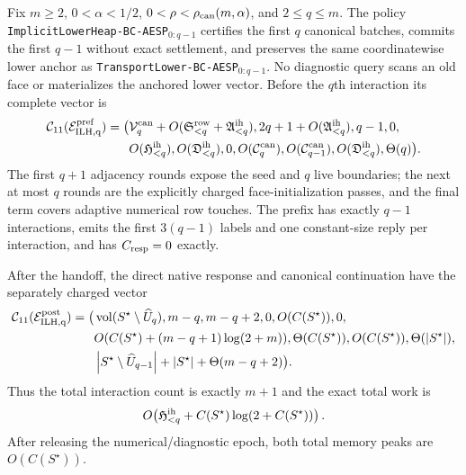 \begin{theorem}
\label{thm:branch-caterpillar-implicit-lower-handoff}
Fix $m\geq2$, $0<\alpha<1/2$,
$0<\rho<\rho_{\rm can}(m,\alpha)$, and $2\leq q\leq m$.
The policy
\texttt{ImplicitLowerHeap-BC-AESP}$_{0:q-1}$ certifies the first $q$
canonical batches, commits the first $q-1$ without exact settlement, and
preserves the same coordinatewise lower anchor as
\texttt{TransportLower-BC-AESP}$_{0:q-1}$.  No diagnostic query scans an old
face or materializes the anchored lower vector.  Before the $q$th interaction
its complete vector is
\begin{equation}
 \begin{aligned}
 \mathcal C_{11}(\mathcal E_{\rm ILH,q}^{\rm pref})=\bigl(&
 \mathcal V_q^{\rm can}
   +O(\mathfrak S_{<q}^{\rm row}+\mathfrak A_{<q}^{\rm ih}),
 2q+1+O(\mathfrak A_{<q}^{\rm ih}),q-1,0,\\
 &O(\mathfrak H_{<q}^{\rm ih}),
 O(\mathfrak D_{<q}^{\rm ih}),0,
 O(\mathcal C_q^{\rm can}),
 O(\mathcal C_{q-1}^{\rm can}),
 O(\mathfrak D_{<q}^{\rm ih}),\Theta(q)\bigr).
 \end{aligned}
 \label{eq:branch-caterpillar-implicit-lower-prefix-eleven-vector}
\end{equation}
The first $q+1$ adjacency rounds expose the seed and $q$ live boundaries;
the next at most $q$ rounds are the explicitly charged face-initialization
passes, and the final term covers adaptive numerical row touches.  The
prefix has exactly $q-1$ interactions, emits the first $3(q-1)$ labels and
one constant-size reply per interaction, and has $C_{\rm resp}=0$ exactly.

After the handoff, the direct native response and canonical continuation have
the separately charged vector
\begin{equation}
 \begin{aligned}
 \mathcal C_{11}(\mathcal E_{\rm ILH,q}^{\rm post})=\bigl(&
 \operatorname{vol}(S^\star\setminus\widehat U_q),m-q,m-q+2,0,
 O(C(S^\star)),0,\\
 &O(C(S^\star)+(m-q+1)\log(2+m)),
 \Theta(C(S^\star)),O(C(S^\star)),
 \Theta(\left\lvert S^\star \right\rvert),\\
 &\left\lvert S^\star\setminus\widehat U_{q-1} \right\rvert
  +\left\lvert S^\star \right\rvert+\Theta(m-q+2)\bigr).
 \end{aligned}
 \label{eq:branch-caterpillar-implicit-lower-post-eleven-vector}
\end{equation}
Thus the total interaction count is exactly $m+1$ and the exact total work is
\begin{equation}
 O\!\left(\mathfrak H_{<q}^{\rm ih}
       +C(S^\star)\log(2+C(S^\star))\right).
 \label{eq:branch-caterpillar-implicit-lower-total-work}
\end{equation}
After releasing the numerical/diagnostic epoch, both total memory peaks are
$O(C(S^\star))$.


\end{theorem}
